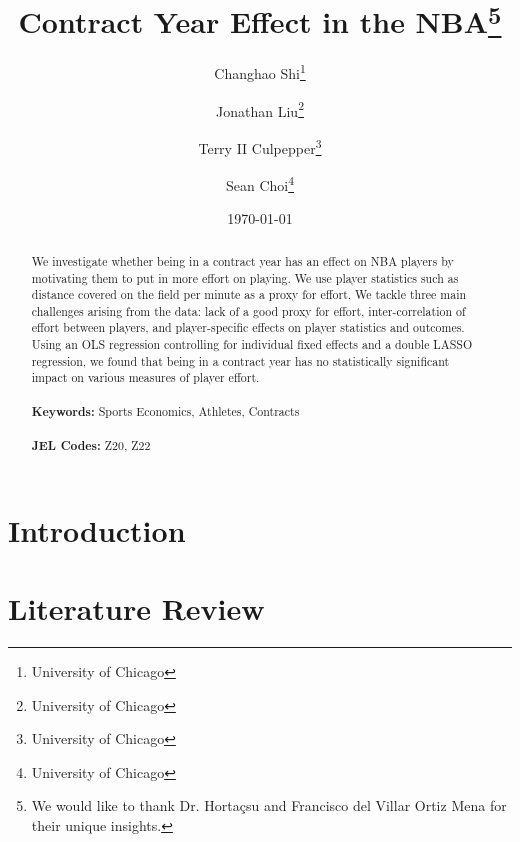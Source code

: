 \documentclass[12pt]{article}
\begin{document}
	
	\begin{titlepage}
		\title{Contract Year Effect in the NBA\thanks{We would like to thank Dr. Hortaçsu and Francisco del Villar Ortiz Mena for their unique insights.}}
		\author{Changhao Shi\thanks{University of Chicago} \and Jonathan Liu\thanks{University of Chicago} \and Terry II Culpepper\thanks{University of Chicago} \and Sean Choi\thanks{University of Chicago}}
		\date{\today}
		\maketitle
		\begin{abstract}
			\noindent We investigate whether being in a contract year has an effect on NBA players by motivating them to put in more effort on playing. We use player statistics such as distance covered on the field per minute as a proxy for effort. We tackle three main challenges arising from the data: lack of a good proxy for effort, inter-correlation of effort between players, and player-specific effects on player statistics and outcomes. Using an OLS regression controlling for individual fixed effects and a double LASSO regression, we found that being in a contract year has no statistically significant impact on various measures of player effort. \\
			\vspace{0in}\\
			\noindent\textbf{Keywords:} Sports Economics, Athletes, Contracts\\
			\vspace{0in}\\
			\noindent\textbf{JEL Codes:} Z20, Z22 \\
			
			\bigskip
		\end{abstract}
		\setcounter{page}{0}
		\thispagestyle{empty}
	\end{titlepage}
	\pagebreak \newpage
	


	
	\doublespacing
	
	
	\section{Introduction} \label{sec:introduction}
	
	\section{Literature Review} \label{sec:literature}
	
\end{document}
